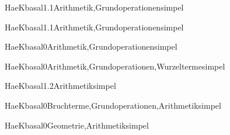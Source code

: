 \documentclass[12pt]{article}
\begin{document}
\begin{Add}{HaeK}{basal1.1}{Arithmetik,Grundoperationen}{simpel}
\end{Add}

\begin{Add}{HaeK}{basal1.1}{Arithmetik,Grundoperationen}{simpel}
\end{Add}

\begin{Add}{HaeK}{basal0}{Arithmetik,Grundoperationen}{simpel}
\end{Add}

\begin{Add}{HaeK}{basal0}{Arithmetik,Grundoperationen,Wurzelterme}{simpel}
\end{Add}

\begin{Add}{HaeK}{basal1.2}{Arithmetik}{simpel}
\end{Add}

\begin{Add}{HaeK}{basal0}{Bruchterme,Grundoperationen,Arithmetik}{simpel}
\end{Add}

\begin{Add}{HaeK}{basal0}{Geometrie,Arithmetik}{simpel}
\end{Add}
\end{document}
